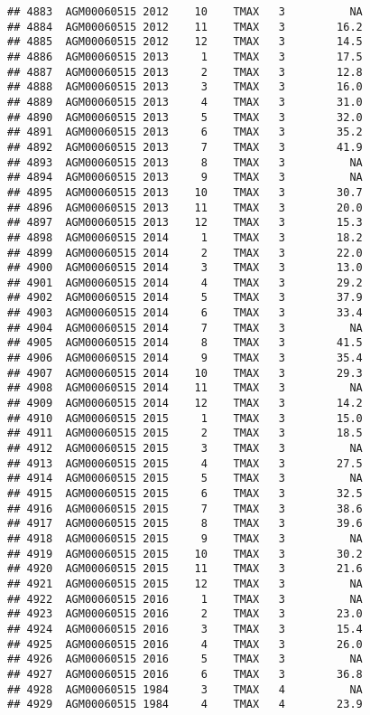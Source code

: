 \documentclass{article}\usepackage[]{graphicx}\usepackage[]{color}
\makeatletter
\newenvironment{kframe}{%
 \def\at@end@of@kframe{}%
 \ifinner\ifhmode%
  \def\at@end@of@kframe{\end{minipage}}%
  \begin{minipage}{\columnwidth}%
 \fi\fi%
 \def\FrameCommand##1{\hskip\@totalleftmargin \hskip-\fboxsep
 \colorbox{shadecolor}{##1}\hskip-\fboxsep
     \hskip-\linewidth \hskip-\@totalleftmargin \hskip\columnwidth}%
 \MakeFramed {\advance\hsize-\width
   \@totalleftmargin\z@ \linewidth\hsize
   \@setminipage}}%
 {\par\unskip\endMakeFramed%
 \at@end@of@kframe}
\newenvironment{knitrout}{}{} %
\makeatother
\begin{document}
\begin{knitrout}
\begin{kframe}
\begin{verbatim}
## 4883  AGM00060515 2012    10    TMAX   3          NA
## 4884  AGM00060515 2012    11    TMAX   3        16.2
## 4885  AGM00060515 2012    12    TMAX   3        14.5
## 4886  AGM00060515 2013     1    TMAX   3        17.5
## 4887  AGM00060515 2013     2    TMAX   3        12.8
## 4888  AGM00060515 2013     3    TMAX   3        16.0
## 4889  AGM00060515 2013     4    TMAX   3        31.0
## 4890  AGM00060515 2013     5    TMAX   3        32.0
## 4891  AGM00060515 2013     6    TMAX   3        35.2
## 4892  AGM00060515 2013     7    TMAX   3        41.9
## 4893  AGM00060515 2013     8    TMAX   3          NA
## 4894  AGM00060515 2013     9    TMAX   3          NA
## 4895  AGM00060515 2013    10    TMAX   3        30.7
## 4896  AGM00060515 2013    11    TMAX   3        20.0
## 4897  AGM00060515 2013    12    TMAX   3        15.3
## 4898  AGM00060515 2014     1    TMAX   3        18.2
## 4899  AGM00060515 2014     2    TMAX   3        22.0
## 4900  AGM00060515 2014     3    TMAX   3        13.0
## 4901  AGM00060515 2014     4    TMAX   3        29.2
## 4902  AGM00060515 2014     5    TMAX   3        37.9
## 4903  AGM00060515 2014     6    TMAX   3        33.4
## 4904  AGM00060515 2014     7    TMAX   3          NA
## 4905  AGM00060515 2014     8    TMAX   3        41.5
## 4906  AGM00060515 2014     9    TMAX   3        35.4
## 4907  AGM00060515 2014    10    TMAX   3        29.3
## 4908  AGM00060515 2014    11    TMAX   3          NA
## 4909  AGM00060515 2014    12    TMAX   3        14.2
## 4910  AGM00060515 2015     1    TMAX   3        15.0
## 4911  AGM00060515 2015     2    TMAX   3        18.5
## 4912  AGM00060515 2015     3    TMAX   3          NA
## 4913  AGM00060515 2015     4    TMAX   3        27.5
## 4914  AGM00060515 2015     5    TMAX   3          NA
## 4915  AGM00060515 2015     6    TMAX   3        32.5
## 4916  AGM00060515 2015     7    TMAX   3        38.6
## 4917  AGM00060515 2015     8    TMAX   3        39.6
## 4918  AGM00060515 2015     9    TMAX   3          NA
## 4919  AGM00060515 2015    10    TMAX   3        30.2
## 4920  AGM00060515 2015    11    TMAX   3        21.6
## 4921  AGM00060515 2015    12    TMAX   3          NA
## 4922  AGM00060515 2016     1    TMAX   3          NA
## 4923  AGM00060515 2016     2    TMAX   3        23.0
## 4924  AGM00060515 2016     3    TMAX   3        15.4
## 4925  AGM00060515 2016     4    TMAX   3        26.0
## 4926  AGM00060515 2016     5    TMAX   3          NA
## 4927  AGM00060515 2016     6    TMAX   3        36.8
## 4928  AGM00060515 1984     3    TMAX   4          NA
## 4929  AGM00060515 1984     4    TMAX   4        23.9

\end{verbatim}
\end{kframe}
\end{knitrout}
\end{document}
